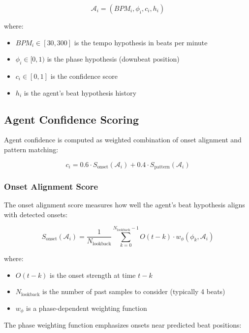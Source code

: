 \documentclass[11pt,a4paper]{article}
\begin{document}
\begin{equation}
\mathcal{A}_i = (BPM_i, \phi_i, c_i, h_i)
\end{equation}

\noindent where:
\begin{itemize}
\item $BPM_i \in [30, 300]$ is the tempo hypothesis in beats per minute
\item $\phi_i \in [0, 1)$ is the phase hypothesis (downbeat position)
\item $c_i \in [0, 1]$ is the confidence score
\item $h_i$ is the agent's beat hypothesis history
\end{itemize}

\subsection{Agent Confidence Scoring}

Agent confidence is computed as weighted combination of onset alignment and pattern matching:

\begin{equation}
c_i = 0.6 \cdot S_{\text{onset}}(\mathcal{A}_i) + 0.4 \cdot S_{\text{pattern}}(\mathcal{A}_i)
\end{equation}

\subsubsection{Onset Alignment Score}

The onset alignment score measures how well the agent's beat hypothesis aligns with detected onsets:

\begin{equation}
S_{\text{onset}}(\mathcal{A}_i) = \frac{1}{N_{\text{lookback}}} \sum_{k=0}^{N_{\text{lookback}}-1} O(t-k) \cdot w_{\phi}(\phi_k, \mathcal{A}_i)
\end{equation}

\noindent where:
\begin{itemize}
\item $O(t-k)$ is the onset strength at time $t-k$
\item $N_{\text{lookback}}$ is the number of past samples to consider (typically 4 beats)
\item $w_{\phi}$ is a phase-dependent weighting function
\end{itemize}

The phase weighting function emphasizes onsets near predicted beat positions:
\end{document}
